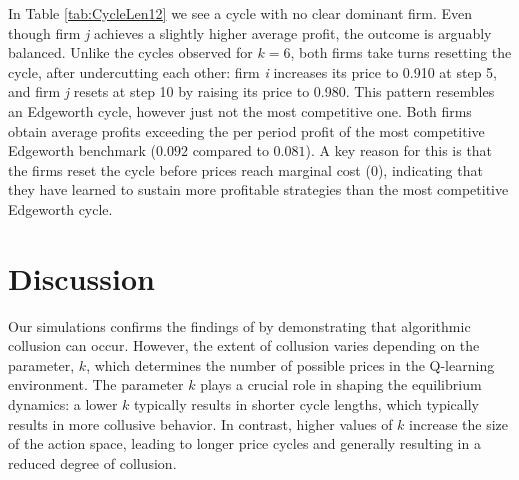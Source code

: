 \documentclass{article}
\begin{document}
In Table \ref{tab:CycleLen12} we see a cycle with no clear dominant firm. Even though firm \textit{j} achieves a slightly higher average profit, the outcome is arguably balanced. Unlike the cycles observed for $k =6 $, both firms take turns resetting the cycle, after undercutting each other: firm \textit{i} increases its price to 0.910 at step 5, and firm \textit{j} resets at step 10 by raising its price to 0.980. This pattern resembles an Edgeworth cycle, however just not the most competitive one. Both firms obtain average profits exceeding the per period profit of the most competitive Edgeworth benchmark ($0.092$ compared to $0.081$). A key reason for this is that the firms reset the cycle before prices reach marginal cost (0), indicating that they have learned to sustain more profitable strategies than the most competitive Edgeworth cycle.
 
\section{Discussion}
Our simulations confirms the findings of \cite{Klein2021} by demonstrating that algorithmic collusion can occur. However, the extent of collusion varies depending on the parameter, \( k \), which determines the number of possible prices in the Q-learning environment. The parameter \( k \) plays a crucial role in shaping the equilibrium dynamics: a lower \( k \) typically results in shorter cycle lengths, which typically results in more collusive behavior. In contrast, higher values of \( k \) increase the size of the action space, leading to longer price cycles and generally resulting in a reduced degree of collusion.
\end{document}
